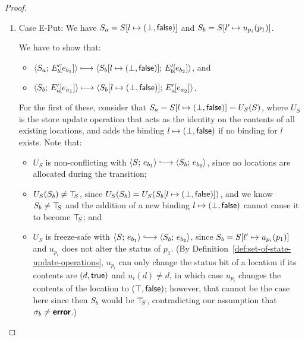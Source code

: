\begin{proof}
\begin{enumerate}
\begin{enumerate}
\begin{itemize}
      \end{itemize}

    \item \label{slqc-new-put}Case {\sc E-Put}: We have $S_a =
      S[l \mapsto (\bot, \textsf{false})]$ and $S_b =
      S[l' \mapsto u_{p_i}(p_1)]$.

      We have to show that:
      \begin{itemize}
      \item $\langle S_a;\, E'_b\hspace{-1mm}\left[e_{b_1}\right] \rangle \longmapsto
        \langle S_b[l \mapsto (\bot, \textsf{false})];\, E'_b\hspace{-1mm}\left[e_{b_2}\right] \rangle$,
        and
      \item
        $\langle S_b;\, E'_a\hspace{-1mm}\left[e_{a_1}\right] \rangle \longmapsto
        \langle S_b[l \mapsto (\bot, \textsf{false})];\, E'_a\hspace{-1mm}\left[e_{a_2}\right] \rangle$.
      \end{itemize}

      For the first of these, consider that $S_a =
      S[l \mapsto (\bot, \textsf{false})] = U_S(S)$, where $U_S$ is the
      store update operation that acts as the identity on the contents
      of all existing locations, and adds the binding
      $l \mapsto (\bot, \textsf{false})$ if no binding for $l$
      exists.  Note that:
      \begin{itemize}
      \item $U_S$ is non-conflicting with $\config{S}{e_{b_1}}
        \parstepsto \config{S_b}{e_{b_2}}$, since no locations are
        allocated during the transition;
      \item $U_S(S_b) \neq \top\hspace{-0.85mm}_{S}$, since $U_S(S_b) =
        U_S(S_b[l \mapsto (\bot, \textsf{false})])$,  and we know $S_b \neq \top\hspace{-0.85mm}_{S}$ and the addition of a
        new binding $l \mapsto (\bot, \textsf{false})$ cannot
        cause it to become $\top\hspace{-0.85mm}_{S}$; and
      \item $U_S$ is freeze-safe with $\config{S}{e_{b_1}} \parstepsto
        \config{S_b}{e_{b_2}}$, since $S_b =
        S[l' \mapsto u_{p_i}(p_1)]$ and $u_{p_i}$ does not alter
        the status of $p_1$.  (By
        Definition~\ref{def:set-of-state-update-operations}, $u_{p_i}$
        can only change the status bit of a location if its contents
        are $(d, \textsf{true})$ and $u_i(d) \neq d$, in which
        case $u_{p_i}$ changes the contents of the location to
        $(\top, \textsf{false})$; however, that cannot be the case
        here since then $S_b$ would be $\top\hspace{-0.85mm}_{S}$, contradicting our
        assumption that $\sigma_b \neq \textbf{\textsf{error}}$.)
      \end{itemize}


\end{enumerate}
\end{enumerate}
\end{proof}
